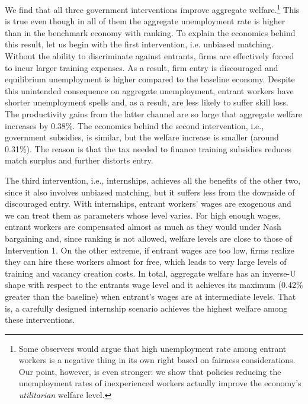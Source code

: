 \documentclass[12pt]{article} %
\theoremstyle{definition}
\begin{document}
We find that all three government interventions improve aggregate welfare.\footnote{Some observers would argue that high unemployment rate among entrant workers is a negative thing in its own right based on fairness considerations. Our point, however, is even stronger: we show that policies reducing the unemployment rates of inexperienced workers actually improve the economy's \textit{utilitarian} welfare level.}
This is true even though in all of them the aggregate unemployment rate is higher than in the benchmark economy with ranking.
To explain the economics behind this result, let us begin with the first intervention, i.e. unbiased matching.
Without the ability to discriminate against entrants, firms are effectively forced to incur larger training expenses.
As a result, firm entry is discouraged and equilibrium unemployment is higher compared to the baseline economy.
Despite this unintended consequence on aggregate unemployment, entrant workers have shorter unemployment spells and, as a result, are less likely to suffer skill loss.
The productivity gains from the latter channel are so large that aggregate welfare increases by 0.38\%. %
The economics behind the second intervention, i.e., government subsidies, is similar, but the welfare increase is smaller (around 0.31\%).
The reason is that the tax needed to finance training subsidies reduces match surplus and further distorts entry.

The third intervention, i.e., internships, achieves all the benefits of the other two, since it also involves unbiased matching, but it suffers less from the downside of discouraged entry. With internships, entrant workers' wages are exogenous and we can treat them as parameters whose level varies.
For high enough wages, entrant workers are compensated almost as much as they would under Nash bargaining and, since ranking is not allowed, welfare levels are close to those of Intervention 1.
On the other extreme, if entrant wages are too low, firms realize they can hire these workers almost for free, which leads to very large levels of training and vacancy creation costs. In total, aggregate welfare has an inverse-U shape with respect to the entrants wage level and it achieves its maximum (0.42\% greater than the baseline) when entrant's wages are at intermediate levels. That is, a carefully designed internship scenario achieves the highest welfare among these interventions.

\end{document}

